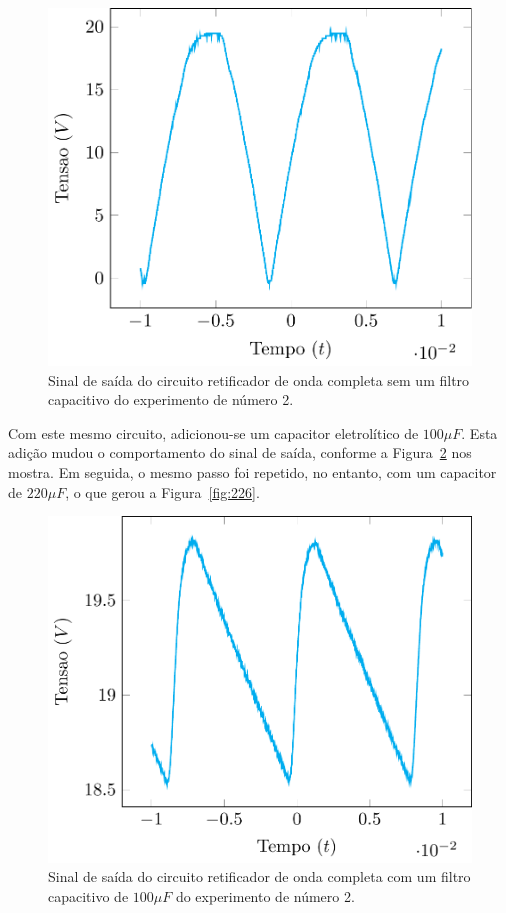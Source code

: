 \documentclass[12pt,a4paper]{article}
\begin{document}
\begin{figure}[htpb]
  \centering
  \includegraphics[width=0.8\linewidth]{224.pdf}
  \caption{Sinal de saída do circuito retificador de onda completa sem um filtro capacitivo do experimento de número 2.}
  \label{fig:224}
\end{figure}

Com este mesmo circuito, adicionou-se um capacitor eletrolítico de $100\mu F$. Esta adição mudou o comportamento do sinal de saída, conforme a Figura~\ref{fig:225} nos mostra. Em seguida, o mesmo passo foi repetido, no entanto, com um capacitor de $220\mu F$, o que gerou a Figura~\ref{fig:226}.

\begin{figure}[htpb]
  \centering
  \includegraphics[width=0.8\linewidth]{226.pdf}
  \caption{Sinal de saída do circuito retificador de onda completa com um filtro capacitivo de $100\mu F$ do experimento de número 2.}
  \label{fig:225}
\end{figure}
\end{document}
